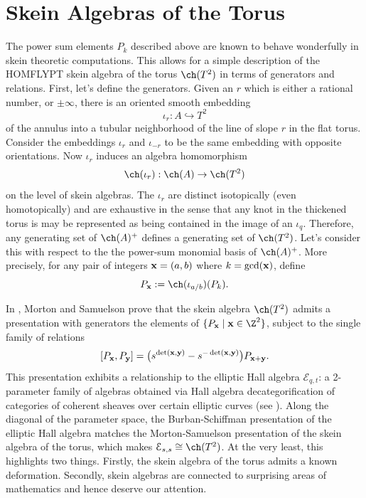 \section{Skein Algebras of the Torus}

The power sum elements $P_k$ described above are known to behave wonderfully in skein theoretic computations. This allows for a simple description of the HOMFLYPT skein algebra of the torus $\ch(T^2)$ in terms of generators and relations. First, let's define the generators. Given an $r$ which is either a rational number, or $\pm \infty$, there is an oriented smooth embedding 
\[
\iota_{r}: A \hookrightarrow T^2
\]
of the annulus into a tubular neighborhood of the line of slope $r$ in the flat torus. Consider the embeddings $\iota_{r}$ and $\iota_{-r}$ to be the same embedding with opposite orientations. Now $\iota_r$ induces an algebra homomorphism
\[
\ch(\iota_r): \ch(A) \to \ch(T^2)
\]
on the level of skein algebras. The $\iota_r$ are distinct isotopically (even homotopically) and are exhaustive in the sense that any knot in the thickened torus is may be represented as being contained in the image of an $\iota_q$. Therefore, any generating set of $\ch(A)^+$ defines a generating set of $\ch(T^2)$. Let's consider this with respect to the the power-sum monomial basis of $\ch(A)^+$. More precisely, for any pair of integers ${\mathbf{x}} = (a, b)$ where $k = \gcd({\mathbf{x}})$, define 
\[
P_\xx := \ch(\iota_{a/b})(P_k).
\]

In \cite{MS17}, Morton and Samuelson prove that the skein algebra $\ch(T^2)$ admits a presentation with generators the elements of $\{ P_\xx \mid \xx \in \Z^2 \}$, subject to the single family of relations 
\[
[P_{\mathbf{x}}, P_{\mathbf{y}}] = \big( s^{\det({\mathbf{x}},{\mathbf{y}})} - s^{-\det({\mathbf{x}},{\mathbf{y}})} \big) P_{{\mathbf{x}} + {\mathbf{y}}}.
\]
This presentation exhibits a relationship to the elliptic Hall algebra $\mathcal{E}_{q,t}$: a 2-parameter family of algebras obtained via Hall algebra decategorification of categories of coherent sheaves over certain elliptic curves (see \cite{BS12}). Along the diagonal of the parameter space, the Burban-Schiffman presentation of the elliptic Hall algebra matches the Morton-Samuelson presentation of the skein algebra of the torus, which makes $\mathcal{E}_{s,s} \cong \ch(T^2)$. At the very least, this highlights two things. Firstly, the skein algebra of the torus admits a known deformation. Secondly, skein algebras are connected to surprising areas of mathematics and hence deserve our attention. 

